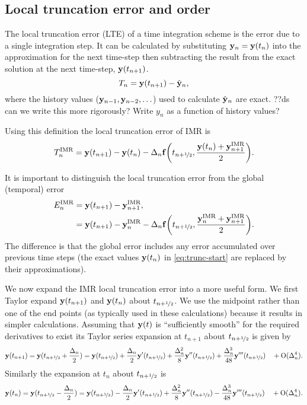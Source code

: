 \subsection{Local truncation error and order}
\label{sec:deriv-local-trunc}

The local truncation error (LTE) of a time integration scheme is the error due to a single integration step.
It can be calculated by substituting $\mathbf{y}_n = \mathbf{y}(t_n)$ into the approximation for the next time-step then subtracting the result from the exact solution at the next time-step, $\mathbf{y}(t_{n+1})$. 
\ie
\begin{equation}
  T_n = \mathbf{y}(t_{n+1}) - \hat{\mathbf{y}}_n,
\end{equation}
where the history values ($\mathbf{y}_{n-1}, \mathbf{y}_{n-2}, \ldots$) used to calculate $\hat{\mathbf{y}}_n$ are exact.
??ds can we write this more rigorously? Write $y_n$ as a function of history values?

Using this definition the local truncation error of IMR is
\begin{equation}
  \lte^\imr =  \yv(t_{n+1}) - \yv(t_n) - \dtn \ffv{\thf, \frac{\yv(t_n) + \yv_{n+1}^\imr}{2}}.
  \label{eq:trunc-start}
\end{equation}

It is important to distinguish the local truncation error from the global (temporal) error
\begin{equation}
  \label{eq:global-temporal-error}
  \begin{aligned}
    E_n^\imr &= \yv(t_{n+1}) - \yv_{n+1}^\imr, \\
    &=  \yv(t_{n+1}) - \yv_n^\imr - \dtn \ffv{ \thf, \frac{\yv_n^\imr + \yv_{n+1}^\imr}{2} }.
  \end{aligned}
\end{equation}
The difference is that the global error includes any error accumulated over previous time steps (the exact values $\mathbf{y}(t_n)$ in \eqref{eq:trunc-start} are replaced by their approximations).

We now expand the IMR local truncation error into a more useful form.
We first Taylor expand $\mathbf{y}(t_{n+1})$ and $\mathbf{y}(t_{n})$ about $t_{n+\nicefrac{1}{2}}$.
We use the midpoint rather than one of the end points (as typically used in these calculations) because it results in simpler calculations.
Assuming that $\mathbf{y}(t)$ is ``sufficiently smooth'' for the required derivatives to exist its Taylor series expansion at $t_{n+1}$ about $t_{n+\nicefrac{1}{2}}$ is given by
\begin{equation}
  \yv(t_{n+1}) = \yv(\thf + \frac{\dtn}{2}) = \yvhf + \frac{\dtn}{2} \yvhf['] 
  + \frac{\dtn^2}{8} \yvhf['']
  + \frac{\dtn^3}{48} \yvhf[''']
  \porder{\dtn^4}.
  \label{eq:taylornp1}
\end{equation}
Similarly the expansion at $t_n$ about $t_{n+\nicefrac{1}{2}}$ is
\begin{equation}
  \yv(t_n) = \yv(\thf - \frac{\dtn}{2}) = \yvhf - \frac{\dtn}{2} \yvhf['] 
  + \frac{\dtn^2}{8} \yvhf[''] 
  - \frac{\dtn^3}{48} \yvhf['''] 
  \porder{\dtn^4}.
  \label{eq:taylorn}
\end{equation}

